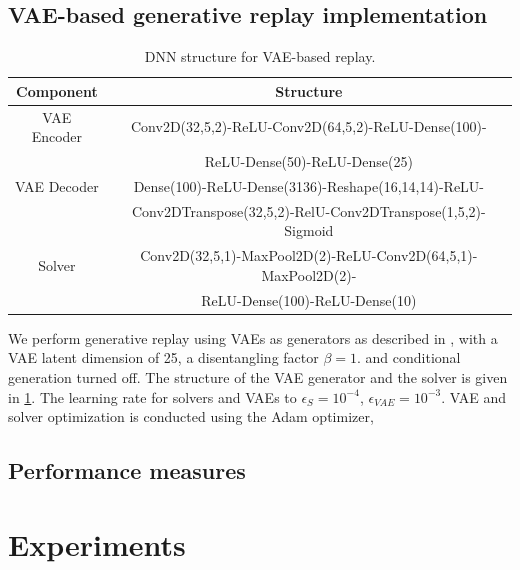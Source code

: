 \documentclass{article} %
\begin{document}
\subsection{VAE-based generative replay implementation}
%
\begin{table}
\caption{DNN structure for VAE-based replay.
\label{tab:networkstructure}
}
\centering
\tiny
\begin{tabular}{|c|c|}
\hline
\textbf{Component}    &  \textbf{Structure}  \\
\hline
VAE Encoder  & Conv2D(32,5,2)-ReLU-Conv2D(64,5,2)-ReLU-Dense(100)-\\
               &  ReLU-Dense(50)-ReLU-Dense(25) \\
VAE Decoder & Dense(100)-ReLU-Dense(3136)-Reshape(16,14,14)-ReLU-\\
            & Conv2DTranspose(32,5,2)-RelU-Conv2DTranspose(1,5,2)-Sigmoid \\
Solver      & Conv2D(32,5,1)-MaxPool2D(2)-ReLU-Conv2D(64,5,1)-MaxPool2D(2)- \\      
            & ReLU-Dense(100)-ReLU-Dense(10)\\
\hline
\end{tabular}
\end{table}
%
%
We perform generative replay using VAEs as generators as described in \cite{nadz22}, 
with a VAE latent dimension of 25, a disentangling factor $\beta=1.$ and conditional generation turned off.
The structure of the VAE generator and the solver is given in \cref{tab:networkstructure}.
%
The learning rate for solvers and VAEs to $\epsilon_S=10^{-4}$, $\epsilon_{VAE}=10^{-3}$.
VAE and solver optimization is conducted using the Adam optimizer, 
%
\subsection{Performance measures}\label{sec:exppeval}

\section{Experiments}\label{sec:exp}
% 
\end{document}
